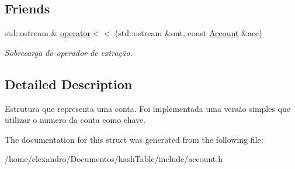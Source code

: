 \subsection*{Friends}
\begin{DoxyCompactItemize}
\item 
\mbox{\label{struct_account_a20fc430074d29d72867204e3f2e976f7}} 
std\+::ostream \& \hyperlink{struct_account_a20fc430074d29d72867204e3f2e976f7}{operator$<$$<$} (std\+::ostream \&out, const \hyperlink{struct_account}{Account} \&acc)
\begin{DoxyCompactList}\small\item\em Sobrecarga do operador de extração. \end{DoxyCompactList}\end{DoxyCompactItemize}


\subsection{Detailed Description}
Estrutura que representa uma conta. Foi implementada uma versão simples que utilizar o numero da conta como chave. 

The documentation for this struct was generated from the following file\+:\begin{DoxyCompactItemize}
\item 
/home/elexandro/\+Documentos/hash\+Table/include/account.\+h\end{DoxyCompactItemize}
